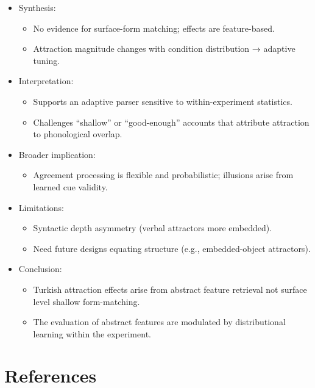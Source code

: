 \documentclass[
  authoryear,
  preprint]{elsarticle}
\providecommand{\tightlist}{%
  \setlength{\itemsep}{0pt}\setlength{\parskip}{0pt}}
\begin{document}
\begin{itemize}
\tightlist
\item
  Synthesis:

  \begin{itemize}
  \tightlist
  \item
    No evidence for surface-form matching; effects are feature-based.
  \item
    Attraction magnitude changes with condition distribution → adaptive
    tuning.
  \end{itemize}
\item
  Interpretation:

  \begin{itemize}
  \tightlist
  \item
    Supports an adaptive parser sensitive to within-experiment
    statistics.
  \item
    Challenges ``shallow'' or ``good-enough'' accounts that attribute
    attraction to phonological overlap.
  \end{itemize}
\item
  Broader implication:

  \begin{itemize}
  \tightlist
  \item
    Agreement processing is flexible and probabilistic; illusions arise
    from learned cue validity.
  \end{itemize}
\item
  Limitations:

  \begin{itemize}
  \tightlist
  \item
    Syntactic depth asymmetry (verbal attractors more embedded).
  \item
    Need future designs equating structure (e.g., embedded-object
    attractors).
  \end{itemize}
\item
  Conclusion:

  \begin{itemize}
  \tightlist
  \item
    Turkish attraction effects arise from abstract feature retrieval not
    surface level shallow form-matching.\\
  \item
    The evaluation of abstract features are modulated by distributional
    learning within the experiment.
  \end{itemize}
\end{itemize}

\section*{References}\label{references}

\newcommand{\doi}[1]{\href{http://dx.doi.org/#1}{http://dx.doi.org/#1}}
\begingroup
\raggedright
\singlespacing

\renewcommand{\bibsection}{}


\endgroup
\end{document}

